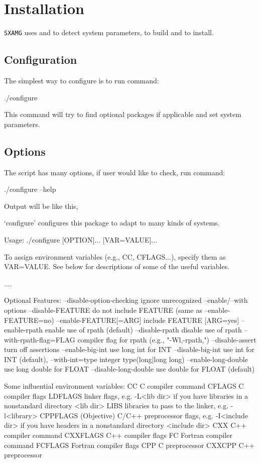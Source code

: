 
\chapter{Installation}


\verb|SXAMG| uses {} and {} 
to detect system parameters, to build and to install.

\section{Configuration}
The simplest way to configure is to run command:
\begin{evb}
./configure
\end{evb}

This command will try to find optional packages if applicable and set system parameters.

\section{Options}
The script {\color{blue}{configure}} has many options, if user would like to check, 
run command:
\begin{evb}
./configure --help
\end{evb}

Output will be like this,
\begin{evb}
`configure' configures this package to adapt to many kinds of systems.

Usage: ./configure [OPTION]... [VAR=VALUE]...

To assign environment variables (e.g., CC, CFLAGS...), specify them as
VAR=VALUE.  See below for descriptions of some of the useful variables.

....

Optional Features:
  --disable-option-checking  ignore unrecognized --enable/--with options
  --disable-FEATURE       do not include FEATURE (same as --enable-FEATURE=no)
  --enable-FEATURE[=ARG]  include FEATURE [ARG=yes]
  --enable-rpath          enable use of rpath (default)
  --disable-rpath         disable use of rpath
  --with-rpath-flag=FLAG  compiler flag for rpath (e.g., "-Wl,-rpath,")
  --disable-assert        turn off assertions
  --enable-big-int        use long int for INT
  --disable-big-int       use int for INT (default),
  --with-int=type         integer type(long|long long)
  --enable-long-double    use long double for FLOAT
  --disable-long-double   use double for FLOAT (default)

Some influential environment variables:
  CC          C compiler command
  CFLAGS      C compiler flags
  LDFLAGS     linker flags, e.g. -L<lib dir> if you have libraries in a
              nonstandard directory <lib dir>
  LIBS        libraries to pass to the linker, e.g. -l<library>
  CPPFLAGS    (Objective) C/C++ preprocessor flags, e.g. -I<include dir> if
              you have headers in a nonstandard directory <include dir>
  CXX         C++ compiler command
  CXXFLAGS    C++ compiler flags
  FC          Fortran compiler command
  FCFLAGS     Fortran compiler flags
  CPP         C preprocessor
  CXXCPP      C++ preprocessor
\end{evb}

